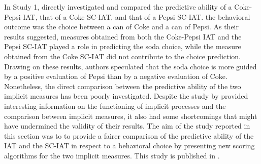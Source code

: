 \documentclass[12pt]{book}
\begin{document}
In Study 1,  directly investigated and compared the predictive ability of a Coke-Pepsi IAT, that of a Coke SC-IAT, and that of a Pepsi SC-IAT. 
the behavioral outcome was the choice between a can of Coke and a can of Pepsi.
As their results suggested, measures obtained from both the Coke-Pepsi IAT and the Pepsi SC-IAT played  a role in predicting the soda choice, while the measure obtained from the Coke SC-IAT did not contribute to the choice prediction. 
Drawing on these results, authors speculated that the soda choice is more guided by a positive evaluation of Pepsi than by a negative evaluation of Coke. Nonetheless, the direct comparison between the predictive ability of the two implicit measures has been poorly investigated. 
Despite the study by  provided interesting information on the functioning of implicit processes and the comparison between implicit measures, it also had some shortcomings that might have undermined the validity of their results. 
The aim of the study reported in this section was to to provide a fairer comparison of the predictive ability of the IAT and the SC-IAT in respect to a behavioral choice by presenting new  scoring algorithms for the two implicit measures. This study is published in .
\end{document}
